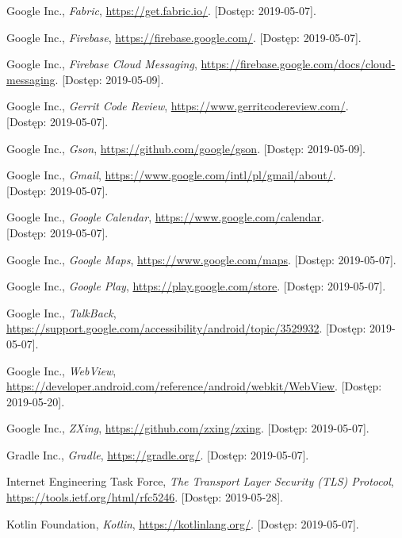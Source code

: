 \documentclass{pracamgr}
\begin{document}
\begin{thebibliography}{99}
 Google Inc., \textit{Fabric}, \url{https://get.fabric.io/}. [Dostęp: 2019-05-07].

 Google Inc., \textit{Firebase}, \url{https://firebase.google.com/}. [Dostęp: 2019-05-07].

 Google Inc., \textit{Firebase Cloud Messaging},
\url{https://firebase.google.com/docs/cloud-messaging}. [Dostęp: 2019-05-09].

 Google Inc., \textit{Gerrit Code Review},
\url{https://www.gerritcodereview.com/}.\\
{[Dostęp: 2019-05-07]}.

 Google Inc., \textit{Gson},	\url{https://github.com/google/gson}. [Dostęp: 2019-05-09].

 Google Inc., \textit{Gmail}, \url{https://www.google.com/intl/pl/gmail/about/}.\\
{[Dostęp: 2019-05-07]}.

 Google Inc., \textit{Google Calendar},	\url{https://www.google.com/calendar}.\\
{[Dostęp: 2019-05-07]}.

 Google Inc., \textit{Google Maps},	\url{https://www.google.com/maps}. [Dostęp: 2019-05-07].

 Google Inc., \textit{Google Play}, \url{https://play.google.com/store}. [Dostęp: 2019-05-07].

 Google Inc., \textit{TalkBack}, \url{https://support.google.com/accessibility/android/topic/3529932}. [Dostęp: 2019-05-07].

 Google Inc., \textit{WebView}, \url{https://developer.android.com/reference/android/webkit/WebView}. [Dostęp: 2019-05-20].

 Google Inc., \textit{ZXing}, \url{https://github.com/zxing/zxing}. [Dostęp: 2019-05-07].


 Gradle Inc., \textit{Gradle}, \url{https://gradle.org/}. [Dostęp: 2019-05-07].


 Internet Engineering Task Force, \textit{The Transport Layer Security (TLS) Protocol},\\
\url{https://tools.ietf.org/html/rfc5246}. [Dostęp: 2019-05-28].


 Kotlin Foundation, \textit{Kotlin}, \url{https://kotlinlang.org/}. [Dostęp: 2019-05-07].



\end{thebibliography}
\end{document}
